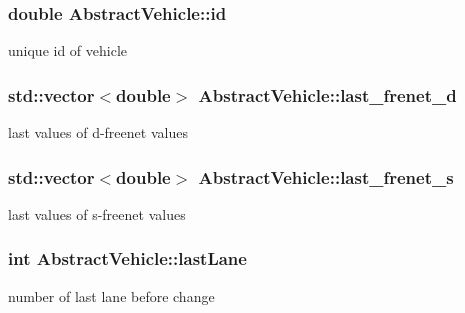 \subsubsection[{\texorpdfstring{id}{id}}]{\setlength{\rightskip}{0pt plus 5cm}double Abstract\+Vehicle\+::id\hspace{0.3cm}{\ttfamily [protected]}}\hypertarget{classAbstractVehicle_ae714379f009c459ec3b3856140204c8e}{}\label{classAbstractVehicle_ae714379f009c459ec3b3856140204c8e}
unique id of vehicle 
\subsubsection[{\texorpdfstring{last\+\_\+frenet\+\_\+d}{last_frenet_d}}]{\setlength{\rightskip}{0pt plus 5cm}std\+::vector$<$double$>$ Abstract\+Vehicle\+::last\+\_\+frenet\+\_\+d\hspace{0.3cm}{\ttfamily [protected]}}\hypertarget{classAbstractVehicle_ac9370b8bc9863b02dbc17f0d3429ce2d}{}\label{classAbstractVehicle_ac9370b8bc9863b02dbc17f0d3429ce2d}
last values of d-\/freenet values 
\subsubsection[{\texorpdfstring{last\+\_\+frenet\+\_\+s}{last_frenet_s}}]{\setlength{\rightskip}{0pt plus 5cm}std\+::vector$<$double$>$ Abstract\+Vehicle\+::last\+\_\+frenet\+\_\+s\hspace{0.3cm}{\ttfamily [protected]}}\hypertarget{classAbstractVehicle_a087956b0de86efa9434da992fdb2d27d}{}\label{classAbstractVehicle_a087956b0de86efa9434da992fdb2d27d}
last values of s-\/freenet values 
\subsubsection[{\texorpdfstring{last\+Lane}{lastLane}}]{\setlength{\rightskip}{0pt plus 5cm}int Abstract\+Vehicle\+::last\+Lane\hspace{0.3cm}{\ttfamily [protected]}}\hypertarget{classAbstractVehicle_adb32774724d498cfcdf2309e0a189b6e}{}\label{classAbstractVehicle_adb32774724d498cfcdf2309e0a189b6e}
number of last lane before change 
